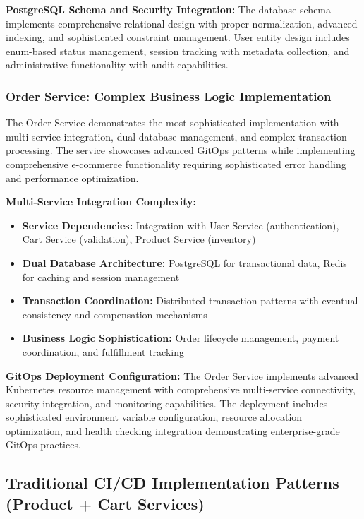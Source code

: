 \textbf{PostgreSQL Schema and Security Integration:}
The database schema implements comprehensive relational design with proper normalization, advanced indexing, and sophisticated constraint management. User entity design includes enum-based status management, session tracking with metadata collection, and administrative functionality with audit capabilities.

\subsubsection{Order Service: Complex Business Logic Implementation}

The Order Service demonstrates the most sophisticated implementation with multi-service integration, dual database management, and complex transaction processing. The service showcases advanced GitOps patterns while implementing comprehensive e-commerce functionality requiring sophisticated error handling and performance optimization.

\textbf{Multi-Service Integration Complexity:}
\begin{itemize}
\item \textbf{Service Dependencies:} Integration with User Service (authentication), Cart Service (validation), Product Service (inventory)
\item \textbf{Dual Database Architecture:} PostgreSQL for transactional data, Redis for caching and session management
\item \textbf{Transaction Coordination:} Distributed transaction patterns with eventual consistency and compensation mechanisms
\item \textbf{Business Logic Sophistication:} Order lifecycle management, payment coordination, and fulfillment tracking
\end{itemize}

\textbf{GitOps Deployment Configuration:}
The Order Service implements advanced Kubernetes resource management with comprehensive multi-service connectivity, security integration, and monitoring capabilities. The deployment includes sophisticated environment variable configuration, resource allocation optimization, and health checking integration demonstrating enterprise-grade GitOps practices.

\subsection{Traditional CI/CD Implementation Patterns (Product + Cart Services)}

